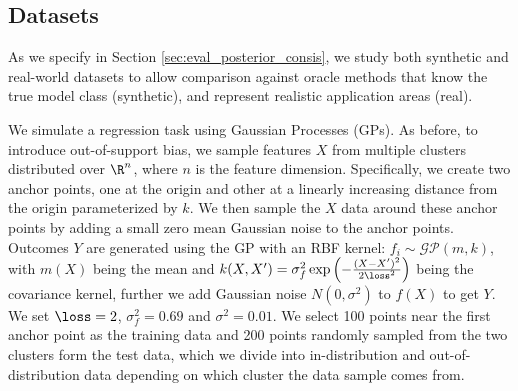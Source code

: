







\subsection{Datasets}  \label{sec:UQ_BENCH_datasets}
As we specify in Section \ref{sec:eval_posterior_consis}, we study both synthetic and real-world datasets
to allow comparison against oracle methods that know the true model class (synthetic), and represent realistic application areas (real). 

 We simulate a regression task using Gaussian Processes (GPs).  
 As before, to introduce out-of-support bias, we sample features $X$ from multiple clusters distributed over $\R^n$, where $n$ is the feature dimension.  Specifically,  we create two anchor points, one at the origin and other at a linearly increasing distance from the origin parameterized by $k$. 
We then sample the $X$ data around these
anchor points by adding a small zero mean Gaussian noise to the anchor points. 
 Outcomes $Y$ are generated using the GP %
with an RBF kernel: $f_i \sim \mathcal{GP}(m,k) $, with $m(X)$ being the mean and $k(X,X') = \sigma_f^2 \exp\left(-\frac{(X-X')^2}{2\loss^2}\right)$ being the covariance kernel, further we add Gaussian noise $N(0,\sigma^2)$ to $f(X)$ to get $Y$.  We set $\loss = 2$, $\sigma_f^2 = 0.69$ and $\sigma^2 = 0.01$.
We select 100 points near the first anchor point as the training data and 
200 points randomly sampled from the two clusters form the test data, which we divide into in-distribution and out-of-distribution data depending on which cluster the data sample comes from.
 

